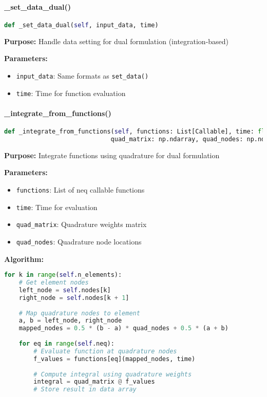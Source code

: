 \paragraph{\_set\_data\_dual()}\leavevmode
\begin{lstlisting}[language=Python, caption=Dual Data Setting Method]
def _set_data_dual(self, input_data, time)
\end{lstlisting}

\textbf{Purpose:} Handle data setting for dual formulation (integration-based)

\textbf{Parameters:}
\begin{itemize}
    \item \texttt{input\_data}: Same formats as \texttt{set\_data()}
    \item \texttt{time}: Time for function evaluation
\end{itemize}

\paragraph{\_integrate\_from\_functions()}\leavevmode
\begin{lstlisting}[language=Python, caption=Function Integration Method]
def _integrate_from_functions(self, functions: List[Callable], time: float, 
                             quad_matrix: np.ndarray, quad_nodes: np.ndarray)
\end{lstlisting}

\textbf{Purpose:} Integrate functions using quadrature for dual formulation

\textbf{Parameters:}
\begin{itemize}
    \item \texttt{functions}: List of neq callable functions
    \item \texttt{time}: Time for evaluation
    \item \texttt{quad\_matrix}: Quadrature weights matrix
    \item \texttt{quad\_nodes}: Quadrature node locations
\end{itemize}

\textbf{Algorithm:}
\begin{lstlisting}[language=Python, caption=Function Integration Algorithm]
for k in range(self.n_elements):  
    # Get element nodes
    left_node = self.nodes[k]
    right_node = self.nodes[k + 1]
    
    # Map quadrature nodes to element
    a, b = left_node, right_node
    mapped_nodes = 0.5 * (b - a) * quad_nodes + 0.5 * (a + b)
    
    for eq in range(self.neq):
        # Evaluate function at quadrature nodes
        f_values = functions[eq](mapped_nodes, time)
        
        # Compute integral using quadrature weights
        integral = quad_matrix @ f_values
        # Store result in data array
\end{lstlisting}

